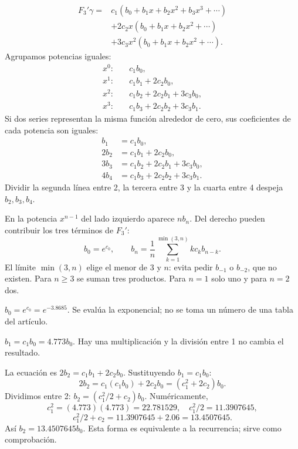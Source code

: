 \begin{align*}
F_3'\gamma={}&c_1(b_0+b_1x+b_2x^2+b_3x^3+\cdots)\\
&+2c_2x(b_0+b_1x+b_2x^2+\cdots)\\
&+3c_3x^2(b_0+b_1x+b_2x^2+\cdots).
\end{align*}
Agrupamos potencias iguales:
\begin{align*}
x^0:&\quad c_1b_0,\\
x^1:&\quad c_1b_1+2c_2b_0,\\
x^2:&\quad c_1b_2+2c_2b_1+3c_3b_0,\\
x^3:&\quad c_1b_3+2c_2b_2+3c_3b_1.
\end{align*}
Si dos series representan la misma función alrededor de cero, sus coeficientes de cada potencia son iguales:
\begin{align*}
b_1&=c_1b_0,\\
2b_2&=c_1b_1+2c_2b_0,\\
3b_3&=c_1b_2+2c_2b_1+3c_3b_0,\\
4b_4&=c_1b_3+2c_2b_2+3c_3b_1.
\end{align*}
Dividir la segunda línea entre 2, la tercera entre 3 y la cuarta entre 4 despeja $b_2,b_3,b_4$.

En la potencia $x^{n-1}$ del lado izquierdo aparece $nb_n$. Del derecho pueden contribuir los tres términos de $F_3'$:
\[
\boxed{b_0=e^{c_0},\qquad b_n=\frac1n\sum_{k=1}^{\min(3,n)}kc_kb_{n-k}.}
\]
El límite $\min(3,n)$ elige el menor de 3 y $n$: evita pedir $b_{-1}$ o $b_{-2}$, que no existen. Para $n\geq3$ se suman tres productos. Para $n=1$ solo uno y para $n=2$ dos.

$b_0=e^{c_0}=e^{-3.8685}$. Se evalúa la exponencial; no se toma un número de una tabla del artículo.

$b_1=c_1b_0=4.773b_0$. Hay una multiplicación y la división entre 1 no cambia el resultado.

La ecuación es $2b_2=c_1b_1+2c_2b_0$. Sustituyendo $b_1=c_1b_0$:
\[
2b_2=c_1(c_1b_0)+2c_2b_0=(c_1^2+2c_2)b_0.
\]
Dividimos entre 2: $b_2=(c_1^2/2+c_2)b_0$. Numéricamente,
\[
c_1^2=(4.773)(4.773)=22.781529,\quad
c_1^2/2=11.3907645,
\]
\[
c_1^2/2+c_2=11.3907645+2.06=13.4507645.
\]
Así $b_2=13.4507645b_0$. Esta forma es equivalente a la recurrencia; sirve como comprobación.

